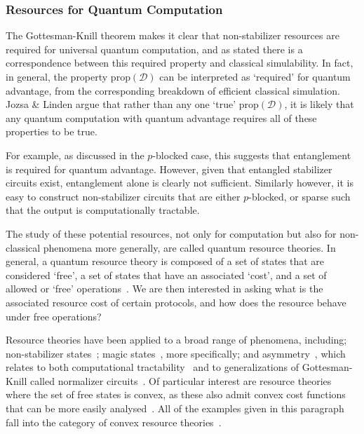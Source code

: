 \subsubsection*{Resources for Quantum Computation}
The Gottesman-Knill theorem makes it clear that non-stabilizer resources are required for universal quantum computation, and as stated there is a correspondence between this required property and classical simulability. In fact, in general, the property $\text{prop}\left(\mathcal{D}\right)$ can be interpreted as `required' for quantum advantage, from the corresponding breakdown of efficient classical simulation. Jozsa \& Linden argue that rather than any one `true' $\text{prop}\left(\mathcal{D}\right)$, it is likely that any quantum computation with quantum advantage requires all of these properties to be true.\par
For example, as discussed in the $p$-blocked case, this suggests that entanglement is required for quantum advantage. However, given that entangled stabilizer circuits exist, entanglement alone is clearly not sufficient. Similarly however, it is easy to construct non-stabilizer circuits that are either $p$-blocked, or sparse such that the output is computationally tractable.\par
The study of these potential resources, not only for computation but also for non-classical phenomena more generally, are called quantum resource theories. In general, a quantum resource theory is composed of a set of states that are considered `free', a set of states that have an associated `cost', and a set of allowed or `free' operations~\cite{Brandao2015}. We are then interested in asking what is the associated resource cost of certain protocols, and how does the resource behave under free operations?\par
Resource theories have been applied to a broad range of phenomena, including; non-stabilizer states~\cite{Veitch2014}; magic states~\cite{Howard2017}, more specifically; and asymmetry~\cite{Piani2016}, which relates to both computational tractability~\cite{VandenNest2009} and to generalizations of Gottesman-Knill called normalizer circuits~\cite{BermejoVega2014}. Of particular interest are resource theories where the set of free states is convex, as these also admit convex cost functions that can be more easily analysed~\cite{Regula2018}. All of the examples given in this paragraph fall into the category of convex resource theories~\cite{Chitambar2019}.\par
